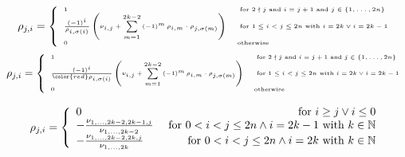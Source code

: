 \documentclass[compress]{beamer}
\begin{document}
\begin{frame}
\begin{overprint}
\begin{equation*}
  \tiny
  \rho_{j,i} = \left\lbrace
\begin{array}{llr}
  1 & \textnormal{ for } 2 \nmid j \textnormal{ and } i = j + 1  \textnormal{ and } j \in \left\lbrace 1, \dots, 2n \right\rbrace \\
  \frac{\left( -1 \right) ^ i}{\rho_{i, \sigma\left( i \right)}} \left( \nu_{i,j} + \sum \limits _{m=1} ^{2k-2} \left( -1 \right) ^m \rho_{i, m} \cdot \rho_{j, \sigma \left( m \right)} \right) &\textnormal{ for } 1 \leq i < j \leq 2n \textnormal { with } i = 2k \lor i=2k-1 \\
  0 & \textnormal{otherwise}
\end{array}
\right.
\end{equation*}
\begin{equation*}
  \tiny
  \rho_{j,i} = \left\lbrace
\begin{array}{llr}
  1 & \textnormal{ for } 2 \nmid j \textnormal{ and } i = j + 1  \textnormal{ and } j \in \left\lbrace 1, \dots, 2n \right\rbrace \\
  \frac{\left( -1 \right) ^ i}{{\color{red} \rho_{i, \sigma\left( i \right)}}} \left( \nu_{i,j} + \sum \limits _{m=1} ^{2k-2} \left( -1 \right) ^m \rho_{i, m} \cdot \rho_{j, \sigma \left( m \right)} \right) &\textnormal{ for } 1 \leq i < j \leq 2n \textnormal { with } i = 2k \lor i=2k-1 \\
  0 & \textnormal{otherwise}
\end{array}
\right.
\end{equation*}
\end{overprint}
\end{frame}

\blankframe{}

\begin{frame}
  \begin{equation*}
    \rho_{j,i} = \left\lbrace
  \begin{array}{lr}
    0 & \textnormal{ for } i \geq j \lor i \leq 0 \\
    -\frac{\nu_{1,\dots,2k-2,2k-1,j}}{\nu_{1,\dots,2k-2}} & \textnormal{ for } 0 < i < j \leq 2n \land i = 2k - 1 \textnormal{ with } k \in \mathbb{N} \\
    -\frac{\nu_{1,\dots,2k-2,2k,j}}{\nu_{1,\dots,2k}} & \textnormal{ for } 0 < i < j \leq 2n \land i = 2k \textnormal{ with } k \in \mathbb{N}
  \end{array} \right.
  \end{equation*}
\end{frame}
\end{document}
